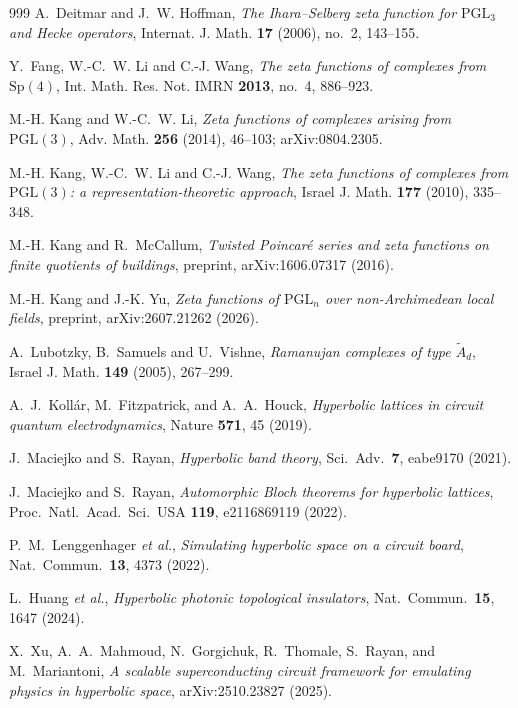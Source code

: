\begin{thebibliography}{999}
 A.~Deitmar and J.~W. Hoffman, \emph{The Ihara--Selberg zeta function for $\mathrm{PGL}_3$ and Hecke operators}, Internat. J. Math. \textbf{17} (2006), no.~2, 143--155.

 Y.~Fang, W.-C.~W. Li and C.-J. Wang, \emph{The zeta functions of complexes from $\mathrm{Sp}(4)$}, Int. Math. Res. Not. IMRN \textbf{2013}, no.~4, 886--923.

 M.-H. Kang and W.-C.~W. Li, \emph{Zeta functions of complexes arising from $\mathrm{PGL}(3)$}, Adv. Math. \textbf{256} (2014), 46--103; arXiv:0804.2305.

 M.-H. Kang, W.-C.~W. Li and C.-J. Wang, \emph{The zeta functions of complexes from $\mathrm{PGL}(3)$: a representation-theoretic approach}, Israel J. Math. \textbf{177} (2010), 335--348.

 M.-H. Kang and R.~McCallum, \emph{Twisted Poincar\'e series and zeta functions on finite quotients of buildings}, preprint, arXiv:1606.07317 (2016).

 M.-H. Kang and J.-K. Yu, \emph{Zeta functions of $\mathrm{PGL}_n$ over non-Archimedean local fields}, preprint, arXiv:2607.21262 (2026).

 A.~Lubotzky, B.~Samuels and U.~Vishne, \emph{Ramanujan complexes of type $\widetilde A_d$}, Israel J. Math. \textbf{149} (2005), 267--299.

 A.~J.~Koll\'ar, M.~Fitzpatrick, and A.~A.~Houck, \emph{Hyperbolic lattices in circuit quantum electrodynamics}, Nature \textbf{571}, 45 (2019).

 J.~Maciejko and S.~Rayan, \emph{Hyperbolic band theory}, Sci.\ Adv.\ \textbf{7}, eabe9170 (2021).

 J.~Maciejko and S.~Rayan, \emph{Automorphic Bloch theorems for hyperbolic lattices}, Proc.\ Natl.\ Acad.\ Sci.\ USA \textbf{119}, e2116869119 (2022).

 P.~M.~Lenggenhager \emph{et al.}, \emph{Simulating hyperbolic space on a circuit board}, Nat.\ Commun.\ \textbf{13}, 4373 (2022).

 L.~Huang \emph{et al.}, \emph{Hyperbolic photonic topological insulators}, Nat.\ Commun.\ \textbf{15}, 1647 (2024).

 X.~Xu, A.~A.~Mahmoud, N.~Gorgichuk, R.~Thomale, S.~Rayan, and M.~Mariantoni, \emph{A scalable superconducting circuit framework for emulating physics in hyperbolic space}, arXiv:2510.23827 (2025).


\end{thebibliography}
